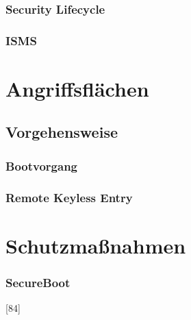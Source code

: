 
\subsection{Security Lifecycle}
\cite{Wurm.2022}
\subsection{ISMS}


\chapter{Angriffsflächen}
\section{Vorgehensweise}
\cite[36]{Wurm.2022}

\subsection{Bootvorgang}
\cite{Wurm.2022}

\subsection{Remote Keyless Entry}
\cite{Garcia.2016}


\chapter{Schutzmaßnahmen}
\subsection{SecureBoot}
\cite{Wurm.2022}[84]